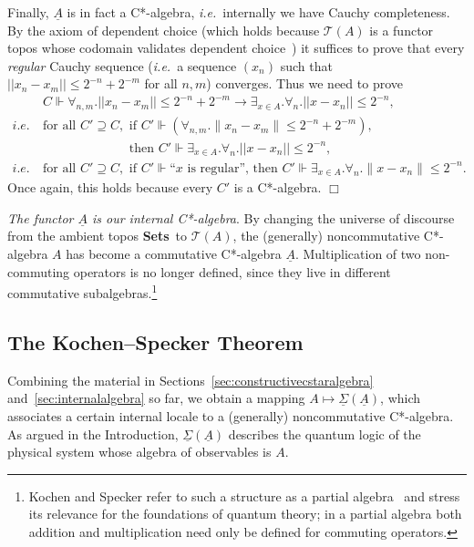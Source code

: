 \documentclass[11pt]{article}
\newcommand{\Sets}{\mbox{\textbf{Sets}}}
\newcommand{\ca}{C*-algebra} \newcommand{\jba}{JB-algebra}
\newcommand{\alg}[1]{\ensuremath{#1}}
\newcommand{\functor}[1]{\ensuremath{\underline{#1}}}
\newcommand{\asstopos}{\ensuremath{\mathcal{T}}}
\newcommand{\uA}{\underline{A}}
\newcommand{\TA}{\mathcal{T}(A)}
\newcommand{\ie}{\textit{i.e.}}
\newcommand{\ulS}{\functor{\Sigma}}
\renewcommand{\TA}{\asstopos(\alg{A})}
\newenvironment{proof}[1][Proof]%
{ \begin{trivlist}%
  \item[\hskip \labelsep {\bfseries #1}]%
}%
{ \end{trivlist}%
}
\newcommand{\qed}{\nobreak\hfill$\Box$}
\begin{document}
\begin{proof}
  Finally, $\functor{\alg{A}}$ is in fact a C*-algebra, \ie\ internally
  we have Cauchy completeness. By the axiom of dependent choice
  (which holds because $\TA$ is a functor topos whose codomain
 validates   dependent choice~\cite{fourmanscedrov82})
   it
  suffices to prove that every \emph{regular} Cauchy sequence (\ie\
 a sequence $(x_n)$ such that
  $||x_n-x_m||\leqslant 2^{-n}+2^{-m}$ for all $n,m$)   converges. Thus we need to
prove
  \begin{align*}
     & C\Vdash \forall_{n,m}. ||x_n-x_m||\leqslant
2^{-n}+2^{-m}\rightarrow \exists_{x\in
       A}. \forall_n. ||x-x_n||\leqslant 2^{-n}, \\
     \ie\ & \mbox{for all }C'\supseteq C, \mbox{ if }C'\Vdash (\forall_{n,m}.
           \|x_n-x_m\|\leqslant 2^{-n}+2^{-m}), \\
         & \phantom{\mbox{for all }C'\supseteq C, }\mbox{ then }C'\Vdash
           \exists_{x\in A}. \forall_n.||x-x_n||\leqslant 2^{-n}, \\
     \ie\ & \mbox{for all }C'\supseteq C, \mbox{ if }C'\Vdash\mbox{``$x$ is
           regular'', then } C'\Vdash\exists_{x\in
           A}. \forall_n.\|x-x_n\|\leqslant 2^{-n}.
  \end{align*}
 Once again, this holds because every $C'$ is a C*-algebra.
  \qed
\end{proof}

\emph{The functor $\functor{\alg{A}}$ is our internal
C*-algebra}. By changing the universe of discourse from the ambient
topos \Sets\ to $\asstopos(\alg{A})$, the (generally) noncommutative
C*-algebra $\alg{A}$ has become a commutative C*-algebra $\functor{\alg{A}}$.
Multiplication of two non-commuting operators is no longer
defined, since they live in different commutative subalgebras.\footnote{Kochen
and Specker refer to such a structure as a partial
algebra~\cite{kochenspecker67} and stress its relevance for
the foundations of quantum theory; in a partial algebra both  addition
and multiplication need only be defined for commuting operators.}
\subsection{The Kochen--Specker Theorem}
\label{sec:spectrum}
Combining the material in Sections~\ref{sec:constructivecstaralgebra}
and~\ref{sec:internalalgebra} so far,
we obtain a mapping $A\mapsto\ulS(\uA)$, which associates a certain internal
locale
to a (generally) noncommutative \ca. As argued in the Introduction,  $\ulS(\uA)$
describes the quantum logic of the physical system whose algebra of observables
is $A$.
\end{document}
